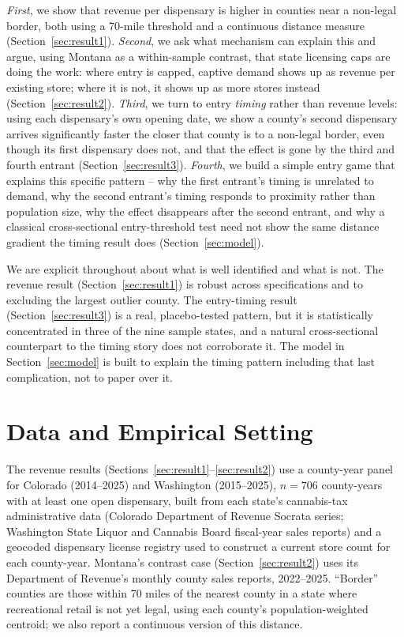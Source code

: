 \documentclass[12pt]{article}
\begin{document}
\emph{First}, we show that revenue per dispensary is higher in counties near a non-legal border, both using
a 70-mile threshold and a continuous distance measure (Section~\ref{sec:result1}). \emph{Second}, we ask what
mechanism can explain this and argue, using Montana as a within-sample contrast, that state licensing caps
are doing the work: where entry is capped, captive demand shows up as revenue per existing store; where it
is not, it shows up as more stores instead (Section~\ref{sec:result2}). \emph{Third}, we turn to entry
\emph{timing} rather than revenue levels: using each dispensary's own opening date, we show a county's second
dispensary arrives significantly faster the closer that county is to a non-legal border, even though its
first dispensary does not, and that the effect is gone by the third and fourth entrant
(Section~\ref{sec:result3}). \emph{Fourth}, we build a simple entry game that explains this specific pattern
-- why the first entrant's timing is unrelated to demand, why the second entrant's timing responds to
proximity rather than population size, why the effect disappears after the second entrant, and why a
classical cross-sectional entry-threshold test need not show the same distance gradient the timing result
does (Section~\ref{sec:model}).

We are explicit throughout about what is well identified and what is not. The revenue result
(Section~\ref{sec:result1}) is robust across specifications and to excluding the largest outlier county. The
entry-timing result (Section~\ref{sec:result3}) is a real, placebo-tested pattern, but it is statistically
concentrated in three of the nine sample states, and a natural cross-sectional counterpart to the timing
story does not corroborate it. The model in Section~\ref{sec:model} is built to explain the timing pattern
including that last complication, not to paper over it.

\section{Data and Empirical Setting}
\label{sec:data}

The revenue results (Sections~\ref{sec:result1}--\ref{sec:result2}) use a county-year panel for Colorado
(2014--2025) and Washington (2015--2025), $n=706$ county-years with at least one open dispensary, built from
each state's cannabis-tax administrative data (Colorado Department of Revenue Socrata series; Washington
State Liquor and Cannabis Board fiscal-year sales reports) and a geocoded dispensary license registry used to
construct a current store count for each county-year. Montana's contrast case
(Section~\ref{sec:result2}) uses its Department of Revenue's monthly county sales reports, 2022--2025.
``Border'' counties are those within 70 miles of the nearest county in a state where recreational retail is
not yet legal, using each county's population-weighted centroid; we also report a continuous version of this
distance.
\end{document}
